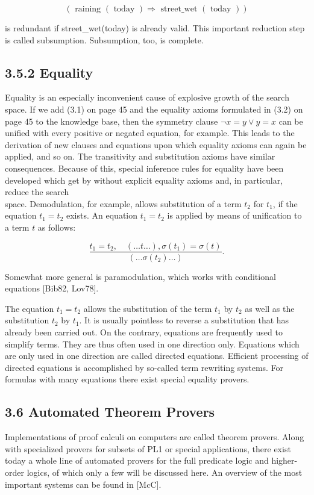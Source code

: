 \documentclass[10pt]{article}
\begin{document}
$$
(\text { raining }(\text { today }) \Rightarrow \text { street_wet }(\text { today }))
$$

is redundant if street\_wet(today) is already valid. This important reduction step is called subsumption. Subsumption, too, is complete.

\subsection*{3.5.2 Equality}
Equality is an especially inconvenient cause of explosive growth of the search space. If we add (3.1) on page 45 and the equality axioms formulated in (3.2) on page 45 to the knowledge base, then the symmetry clause $\neg x=y \vee y=x$ can be unified with every positive or negated equation, for example. This leads to the derivation of new clauses and equations upon which equality axioms can again be applied, and so on. The transitivity and substitution axioms have similar consequences. Because of this, special inference rules for equality have been developed which get by without explicit equality axioms and, in particular, reduce the search\\
space. Demodulation, for example, allows substitution of a term $t_{2}$ for $t_{1}$, if the equation $t_{1}=t_{2}$ exists. An equation $t_{1}=t_{2}$ is applied by means of unification to a term $t$ as follows:

$$
\frac{t_{1}=t_{2}, \quad(\ldots t \ldots), \sigma\left(t_{1}\right)=\sigma(t)}{\left(\ldots \sigma\left(t_{2}\right) \ldots\right)} .
$$

Somewhat more general is paramodulation, which works with conditional equations [Bib82, Lov78].

The equation $t_{1}=t_{2}$ allows the substitution of the term $t_{1}$ by $t_{2}$ as well as the substitution $t_{2}$ by $t_{1}$. It is usually pointless to reverse a substitution that has already been carried out. On the contrary, equations are frequently used to simplify terms. They are thus often used in one direction only. Equations which are only used in one direction are called directed equations. Efficient processing of directed equations is accomplished by so-called term rewriting systems. For formulas with many equations there exist special equality provers.

\subsection*{3.6 Automated Theorem Provers}
Implementations of proof calculi on computers are called theorem provers. Along with specialized provers for subsets of PL1 or special applications, there exist today a whole line of automated provers for the full predicate logic and higher-order logics, of which only a few will be discussed here. An overview of the most important systems can be found in [McC].
\end{document}
